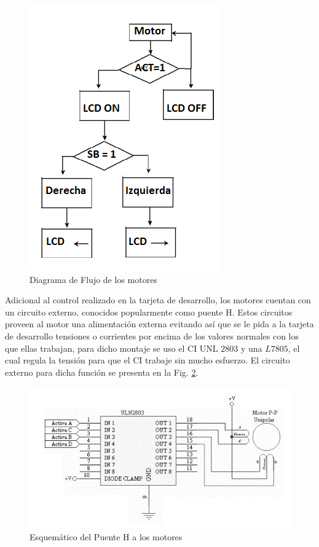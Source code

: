 \documentclass[twocolumn]{IEEEtran}
\begin{document}
\begin{figure}[H]
	\centering
		\includegraphics[scale=0.5]{control2.png}
	\caption{Diagrama de Flujo de los motores}
	\label{fig5}
\end{figure}
\noindent
Adicional al control realizado en la tarjeta de desarrollo, los motores cuentan con un circuito externo, conocidos popularmente como puente H. Estos circuitos proveen al motor una alimentación externa evitando así que se le pida a la tarjeta de desarrollo tensiones o corrientes por encima de los valores normales con los que ellas trabajan, para dicho montaje se uso el CI UNL $2803$ y una $L7805$, el cual regula la tensión para que el CI trabaje sin mucho esfuerzo. El circuito externo para dicha función se presenta en la Fig. \ref{fig6}.
\begin{figure}[H]
	\centering
		\includegraphics[scale=0.5]{esquematico.png}
	\caption{Esquemático del Puente H a los motores}
	\label{fig6}
\end{figure}
\end{document}
